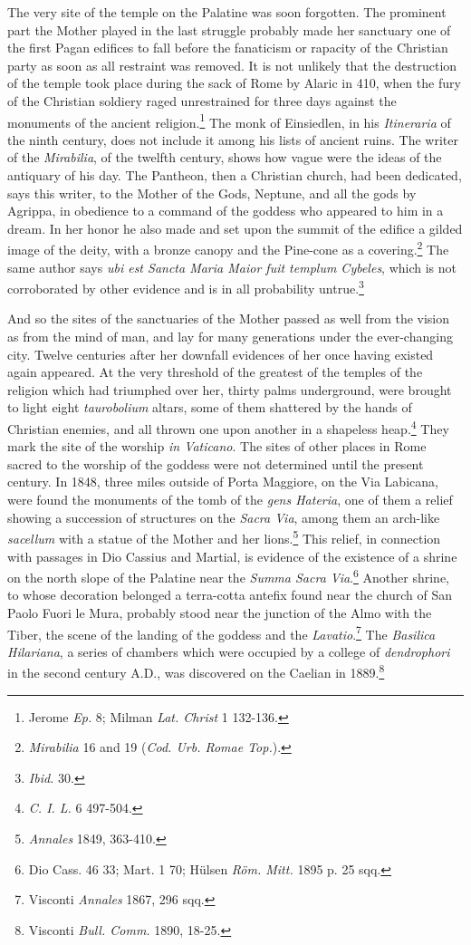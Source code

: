 \documentclass[a4paper, 11pt, oneside, polutonikogreek, english]{article}
\begin{document}
The very site of the temple on the Palatine was soon forgotten. The prominent part the Mother played in the last struggle probably made her sanctuary one of the first Pagan edifices to fall before the fanaticism or rapacity of the Christian party as soon as all restraint was removed. It is not unlikely that the destruction of the temple took place during the sack of Rome by Alaric in 410, when the fury of the Christian soldiery raged unrestrained for three days against the monuments of the ancient religion.\footnote{Jerome \emph{Ep.} 8; Milman \emph{Lat. Christ} 1 132-136.} The monk of Einsiedlen, in his \emph{Itineraria} of the ninth century, does not include it among his lists of ancient ruins. The writer of the \emph{Mirabilia}, of the twelfth century, shows how vague were the ideas of the antiquary of his day. The Pantheon, then a Christian church, had been dedicated, says this writer, to the Mother of the Gods, Neptune, and all the gods by Agrippa, in obedience to a command of the goddess who appeared to him in a dream. In her honor he also made and set upon the summit of the edifice a gilded image of the deity, with a bronze canopy and the Pine-cone as a covering.\footnote{\emph{Mirabilia} 16 and 19 (\emph{Cod. Urb. Romae Top.}).} The same author says \emph{ubi est Sancta Maria Maior fuit templum Cybeles}, which is not corroborated by other evidence and is in all probability untrue.\footnote{\emph{Ibid.} 30.}

And so the sites of the sanctuaries of the Mother passed as well from the vision as from the mind of man, and lay for many generations under the ever-changing city. Twelve centuries after her downfall evidences of her once having existed again appeared. At the very threshold of the greatest of the temples of the religion which had triumphed over her, thirty palms underground, were brought to light eight \emph{taurobolium} altars, some of them shattered by the hands of Christian enemies, and all thrown one upon another in a shapeless heap.\footnote{\emph{C. I. L.} 6 497-504.} They mark the site of the worship \emph{in Vaticano}. The sites of other places in Rome sacred to the worship of the goddess were not determined until the present century. In 1848, three miles outside of Porta Maggiore, on the Via Labicana, were found the monuments of the tomb of the \emph{gens Hateria}, one of them a relief showing a succession of structures on the \emph{Sacra Via}, among them an arch-like \emph{sacellum} with a statue of the Mother and her lions.\footnote{\emph{Annales} 1849, 363-410.} This relief, in connection with passages in Dio Cassius and Martial, is evidence of the existence of a shrine on the north slope of the Palatine near the \emph{Summa Sacra Via}.\footnote{Dio Cass. 46 33; Mart. 1 70; Hülsen \emph{Röm. Mitt.} 1895 p. 25 sqq.} Another shrine, to whose decoration belonged a terra-cotta antefix found near the church of San Paolo Fuori le Mura, probably stood near the junction of the Almo with the Tiber, the scene of the landing of the goddess and the \emph{Lavatio}.\footnote{Visconti \emph{Annales} 1867, 296 sqq.} The \emph{Basilica Hilariana}, a series of chambers which were occupied by a college of \emph{dendrophori} in the second century \textsc{A.D.}, was discovered on the Caelian in 1889.\footnote{Visconti \emph{Bull. Comm.} 1890, 18-25.}
\end{document}
